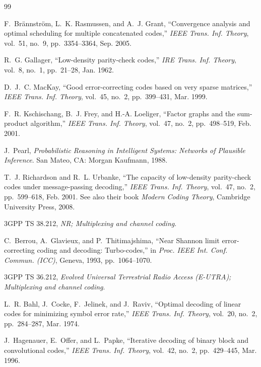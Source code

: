 \documentclass[11pt,a4paper]{article}
\theoremstyle{definition}
\theoremstyle{remark}
\begin{document}
\begin{thebibliography}{99}
\small

F.~Br\"annstr\"om, L.~K. Rasmussen, and A.~J. Grant, ``Convergence analysis and optimal scheduling for multiple concatenated codes,'' \emph{IEEE Trans. Inf. Theory}, vol.~51, no.~9, pp.~3354--3364, Sep. 2005.

R.~G. Gallager, ``Low-density parity-check codes,'' \emph{IRE Trans. Inf. Theory}, vol.~8, no.~1, pp.~21--28, Jan. 1962.

D.~J.~C. MacKay, ``Good error-correcting codes based on very sparse matrices,'' \emph{IEEE Trans. Inf. Theory}, vol.~45, no.~2, pp.~399--431, Mar. 1999.

F.~R. Kschischang, B.~J. Frey, and H.-A. Loeliger, ``Factor graphs and the sum-product algorithm,'' \emph{IEEE Trans. Inf. Theory}, vol.~47, no.~2, pp.~498--519, Feb. 2001.

J.~Pearl, \emph{Probabilistic Reasoning in Intelligent Systems: Networks of Plausible Inference}. San Mateo, CA: Morgan Kaufmann, 1988.

T.~J. Richardson and R.~L. Urbanke, ``The capacity of low-density parity-check codes under message-passing decoding,'' \emph{IEEE Trans. Inf. Theory}, vol.~47, no.~2, pp.~599--618, Feb. 2001. See also their book \emph{Modern Coding Theory}, Cambridge University Press, 2008.

3GPP TS 38.212, \emph{NR; Multiplexing and channel coding}.

C.~Berrou, A.~Glavieux, and P.~Thitimajshima, ``Near Shannon limit error-correcting coding and decoding: Turbo-codes,'' in \emph{Proc. IEEE Int. Conf. Commun. (ICC)}, Geneva, 1993, pp.~1064--1070.

3GPP TS 36.212, \emph{Evolved Universal Terrestrial Radio Access (E-UTRA); Multiplexing and channel coding}.

L.~R. Bahl, J.~Cocke, F.~Jelinek, and J.~Raviv, ``Optimal decoding of linear codes for minimizing symbol error rate,'' \emph{IEEE Trans. Inf. Theory}, vol.~20, no.~2, pp.~284--287, Mar. 1974.

J.~Hagenauer, E.~Offer, and L.~Papke, ``Iterative decoding of binary block and convolutional codes,'' \emph{IEEE Trans. Inf. Theory}, vol.~42, no.~2, pp.~429--445, Mar. 1996.


\end{thebibliography}
\end{document}

